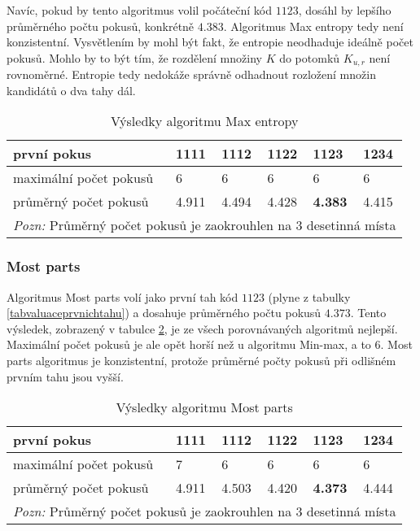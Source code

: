 Navíc, pokud by tento algoritmus volil počáteční kód $1123$, dosáhl by lepšího průměrného počtu pokusů, konkrétně $4.383$. Algoritmus Max entropy tedy není konzistentní. Vysvětlením by mohl být fakt, že entropie neodhaduje ideálně počet pokusů. Mohlo by to být tím, že rozdělení množiny $K$ do potomků $K_{u,r}$ není rovnoměrné. Entropie tedy nedokáže správně odhadnout rozložení množin kandidátů o dva tahy dál. 
\begin{table}[h]
\centering
\begin{tabular}{l l l l l l}
\toprule
první pokus & 1111 & 1112 & 1122 & 1123 & \textbf{1234} \\
\midrule

maximální počet pokusů 
& 6 & 6 & 6 & 6 & 6 \\

průměrný počet pokusů 
& 4.911 & 4.494 & 4.428 & \textbf{4.383} & 4.415 \\
\bottomrule
\multicolumn{6}{l}{\footnotesize \textit{Pozn:}
Průměrný počet pokusů je zaokrouhlen na $3$ desetinná místa}
\end{tabular}
\caption{Výsledky algoritmu Max entropy}\label{tabentropievysl}
\end{table}



\subsubsection{Most parts}
Algoritmus Most parts volí jako první tah kód $1123$ (plyne z tabulky \ref{tabvaluaceprvnichtahu}) a dosahuje průměrného počtu pokusů $4.373$. Tento výsledek, zobrazený v tabulce \ref{tabcastivysl}, je ze všech porovnávaných algoritmů nejlepší. Maximální počet pokusů je ale opět horší než u algoritmu Min-max, a to 6. Most parts algoritmus je konzistentní, protože průměrné počty pokusů při odlišném prvním tahu jsou vyšší.


\begin{table}[h]
\centering
\begin{tabular}{l l l l l l}
\toprule
první pokus & 1111 & 1112 & 1122 & \textbf{1123} & 1234 \\
\midrule

maximální počet pokusů 
& 7 & 6 & 6 & 6 & 6 \\

průměrný počet pokusů 
& 4.911 & 4.503 & 4.420 & \textbf{4.373} & 4.444\\
\bottomrule
\multicolumn{6}{l}{\footnotesize \textit{Pozn:}
Průměrný počet pokusů je zaokrouhlen na $3$ desetinná místa}
\end{tabular}
\caption{Výsledky algoritmu Most parts}\label{tabcastivysl}
\end{table}


